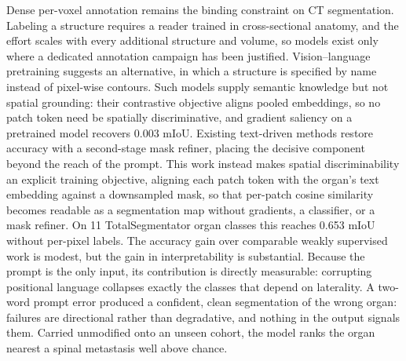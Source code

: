 Dense per-voxel annotation remains the binding constraint on CT segmentation.
Labeling a structure requires a reader trained in cross-sectional anatomy, and
the effort scales with every additional structure and volume, so models exist
only where a dedicated annotation campaign has been justified. Vision--language
pretraining suggests an alternative, in which a structure is specified by name
instead of pixel-wise contours. Such models supply semantic knowledge but not
spatial grounding: their contrastive objective aligns pooled embeddings, so no
patch token need be spatially discriminative, and gradient saliency on a
pretrained model recovers 0.003 mIoU. Existing text-driven methods restore
accuracy with a second-stage mask refiner, placing the decisive component beyond
the reach of the prompt. This work instead makes spatial discriminability an
explicit training objective, aligning each patch token with the organ's text
embedding
against a downsampled mask, so that per-patch cosine similarity becomes readable
as a segmentation map without gradients, a classifier, or a mask refiner. On 11
TotalSegmentator organ classes this reaches 0.653 mIoU without per-pixel labels.
The accuracy gain over comparable weakly supervised work is modest, but the gain
in interpretability is substantial. Because the prompt is the only input, its
contribution is directly measurable: corrupting positional language
collapses exactly the classes that depend on laterality. A two-word prompt error
produced a confident, clean segmentation of the wrong organ: failures are
directional rather than degradative, and nothing in the output signals them.
Carried unmodified onto an unseen cohort, the model ranks the organ nearest a
spinal metastasis well above chance.
